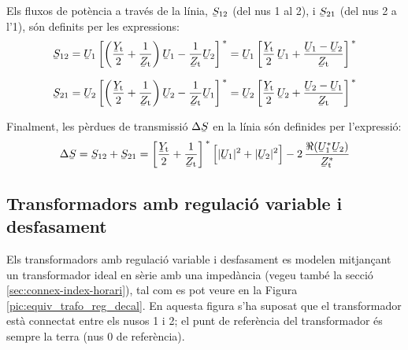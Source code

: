 Els fluxos de potència a través de la línia, $\cmplx{S}_{12}$ (del
nus 1 al 2), i $\cmplx{S}_{21}$ (del nus 2 a l'1), són definits per
les expressions:
\begin{align}
   \cmplx{S}_{12} &= \cmplx{U}_1 \left[ \left( \frac{\cmplx{Y}\ped{t}}{2} + \frac{1}{\cmplx{Z}\ped{t}} \right) \cmplx{U}_1 - \frac{1}{\cmplx{Z}\ped{t}} \cmplx{U}_2 \right]^{\,*} = \cmplx{U}_1 \left[ \frac{\cmplx{Y}\ped{t}}{2}\, \cmplx{U}_1 + \frac{\cmplx{U}_1 - \cmplx{U}_2}{\cmplx{Z}\ped{t}} \right]^{\,*} \label{eq:lin_s12}
   \\[1.5ex]
   \cmplx{S}_{21} &= \cmplx{U}_2 \left[ \left( \frac{\cmplx{Y}\ped{t}}{2} + \frac{1}{\cmplx{Z}\ped{t}} \right) \cmplx{U}_2 - \frac{1}{\cmplx{Z}\ped{t}} \cmplx{U}_1 \right]^{\,*} = \cmplx{U}_2 \left[ \frac{\cmplx{Y}\ped{t}}{2} \,\cmplx{U}_2 + \frac{\cmplx{U}_2 - \cmplx{U}_1}{\cmplx{Z}\ped{t}} \right]^{\,*} \label{eq:lin_s21}
\end{align}

Finalment, les pèrdues de transmissió $\Delta\cmplx{S}$ en la  línia són definides per
l'expressió:
\begin{equation}
   \Delta\cmplx{S} = \cmplx{S}_{12} + \cmplx{S}_{21} = \left[ \frac{\cmplx{Y}\ped{t}}{2} + \frac{1}{\cmplx{Z}\ped{t}} \right]^{\,*} \Big[ |\cmplx{U}_1|^2 + |\cmplx{U}_2|^2 \Big] - 2 \, \frac{\Re (\cmplx{U}_1^* \cmplx{U}_2)}{\cmplx{Z}\ped{t}^*}
\end{equation}

\subsection{Transformadors amb regulació variable i desfasament}

Els transformadors amb regulació variable i desfasament es modelen
mitjançant un transformador ideal en sèrie amb una impedància
(vegeu també la secció \ref{sec:connex-index-horari}), tal
com es pot veure en la Figura \vref{pic:equiv_trafo_reg_decal}. En
aquesta figura s'ha suposat que el transformador està connectat
entre els nusos 1 i 2; el punt de referència del transformador és
sempre  la terra (nus 0 de referència). 

\begin{center}
    
    \label{pic:equiv_trafo_reg_decal}
\end{center}

